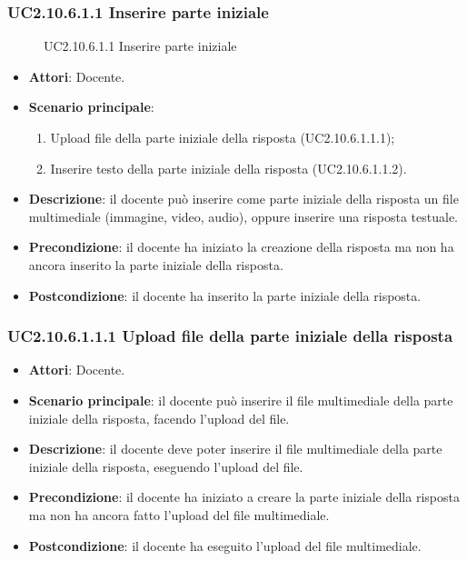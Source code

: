 \subsubsection{UC2.10.6.1.1 Inserire parte iniziale}
\begin{figure}[H]
\centering
\noindent{}
\caption{UC2.10.6.1.1 Inserire parte iniziale}
\end{figure}
\begin{itemize}
\item \textbf{Attori}: Docente.
\item \textbf{Scenario principale}:
\begin{enumerate}
\item Upload file della parte iniziale della risposta (UC2.10.6.1.1.1);
\item Inserire testo della parte iniziale della risposta (UC2.10.6.1.1.2).
\end{enumerate}
\item \textbf{Descrizione}: il docente può inserire come parte iniziale della risposta un file multimediale (immagine, video, audio), oppure inserire una risposta testuale.
\item \textbf{Precondizione}: il docente ha iniziato la creazione della risposta ma non ha ancora inserito la parte iniziale della risposta.
\item \textbf{Postcondizione}: il docente ha inserito la parte iniziale della risposta.
\end{itemize}
\subsubsection{UC2.10.6.1.1.1 Upload file della parte iniziale della risposta}
\begin{itemize}
\item \textbf{Attori}: Docente.
\item \textbf{Scenario principale}: il docente può inserire il file multimediale della parte iniziale della risposta, facendo l'upload del file.
\item \textbf{Descrizione}: il docente deve poter inserire il file multimediale della parte iniziale della risposta, eseguendo l'upload del file.
\item \textbf{Precondizione}: il docente ha iniziato a creare la parte iniziale della risposta ma non ha ancora fatto l'upload del file multimediale.
\item \textbf{Postcondizione}: il docente ha eseguito l'upload del file multimediale.
\end{itemize}
